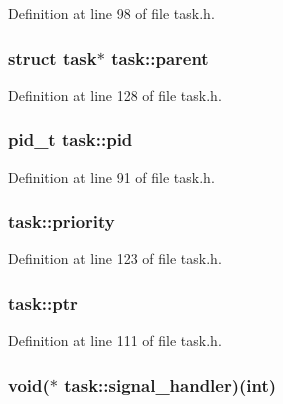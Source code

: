 Definition at line 98 of file task.\+h.

\hypertarget{structtask_a34c6613744820a1e8127756fb6a5392c}{
\subsubsection[{parent}]{\setlength{\rightskip}{0pt plus 5cm}struct {\bf task}$\ast$ task\+::parent}}\label{structtask_a34c6613744820a1e8127756fb6a5392c}


Definition at line 128 of file task.\+h.

\hypertarget{structtask_ab56448ae42a75825ea923bd86648f3ae}{
\subsubsection[{pid}]{\setlength{\rightskip}{0pt plus 5cm}pid\+\_\+t task\+::pid}}\label{structtask_ab56448ae42a75825ea923bd86648f3ae}


Definition at line 91 of file task.\+h.

\hypertarget{structtask_a9ab46b5a6e7c471f1fe32db13e6636a2}{
\subsubsection[{priority}]{ task\+::priority}}\label{structtask_a9ab46b5a6e7c471f1fe32db13e6636a2}


Definition at line 123 of file task.\+h.

\hypertarget{structtask_afbc0623ab058e402e92ea084dc37ab6a}{
\subsubsection[{ptr}]{ task\+::ptr}}\label{structtask_afbc0623ab058e402e92ea084dc37ab6a}


Definition at line 111 of file task.\+h.

\hypertarget{structtask_aea4c9382e5f4f148a0a74c0680729cf0}{
\subsubsection[{signal\+\_\+handler}]{\setlength{\rightskip}{0pt plus 5cm}void($\ast$ task\+::signal\+\_\+handler)(int)}}\label{structtask_aea4c9382e5f4f148a0a74c0680729cf0}



